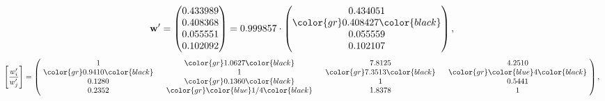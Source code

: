 \begin{example}
\begin{equation*}
\mathbf{w}^{\prime} =
\begin{pmatrix}
0.433989\\
0.408368\\
0.055551\\
0.102092
\end{pmatrix} =
0.999857\cdot
\begin{pmatrix}
0.434051\\
\color{gr} 0.408427\color{black} \\
0.055559\\
0.102107
\end{pmatrix},
\end{equation*}
\begin{equation*}
\left[ \frac{{w}^{\prime}_i}{{w}^{\prime}_j} \right] =
\begin{pmatrix}
$\,\,$ 1 $\,\,$ & $\,\,$\color{gr} 1.0627\color{black} $\,\,$ & $\,\,$7.8125$\,\,$ & $\,\,$4.2510$\,\,$ \\
$\,\,$\color{gr} 0.9410\color{black} $\,\,$ & $\,\,$ 1 $\,\,$ & $\,\,$\color{gr} 7.3513\color{black} $\,\,$ & $\,\,$\color{gr} \color{blue} 4\color{black}   $\,\,$ \\
$\,\,$0.1280$\,\,$ & $\,\,$\color{gr} 0.1360\color{black} $\,\,$ & $\,\,$ 1 $\,\,$ & $\,\,$0.5441 $\,\,$ \\
$\,\,$0.2352$\,\,$ & $\,\,$\color{gr} \color{blue}  1/4\color{black} $\,\,$ & $\,\,$1.8378$\,\,$ & $\,\,$ 1  $\,\,$ \\
\end{pmatrix},
\end{equation*}
\end{example}
\newpage

